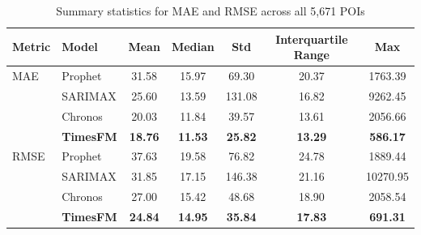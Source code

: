\begin{table}[htbp]
\centering
\caption{Summary statistics for MAE and RMSE across all 5,671 POIs}
\begin{tabular}{llccccc}
\toprule
Metric & Model & Mean & Median & Std & Interquartile Range & Max \\
\midrule
MAE & Prophet & 31.58 & 15.97 & 69.30 & 20.37 & 1763.39 \\
 & SARIMAX & 25.60 & 13.59 & 131.08 & 16.82 & 9262.45 \\
 & Chronos & 20.03 & 11.84 & 39.57 & 13.61 & 2056.66 \\
 & \textbf{TimesFM} & \textbf{18.76} & \textbf{11.53} & \textbf{25.82} & \textbf{13.29} & \textbf{586.17} \\
\midrule
RMSE & Prophet & 37.63 & 19.58 & 76.82 & 24.78 & 1889.44 \\
 & SARIMAX & 31.85 & 17.15 & 146.38 & 21.16 & 10270.95 \\
 & Chronos & 27.00 & 15.42 & 48.68 & 18.90 & 2058.54 \\
 & \textbf{TimesFM} & \textbf{24.84} & \textbf{14.95} & \textbf{35.84} & \textbf{17.83} & \textbf{691.31} \\
\bottomrule
\end{tabular}
\end{table}
